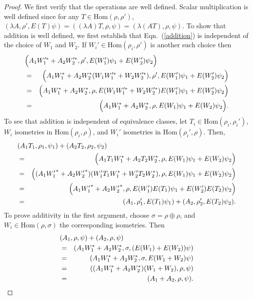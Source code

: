 \documentclass[11pt]{article}
\theoremstyle{definition}
\theoremstyle{definition}
\theoremstyle{remark}
\newcommand{\Hom}{\mathrm{Hom}}
\begin{document}
\begin{proof} We first verify that the operations are well defined.
  Scalar multiplication is well defined since for any $T\in \Hom (\rho
  ,\rho')$, $(\lambda A,\rho ',E(T)\psi )=((\lambda A)T,\rho ,\psi
  )=(\lambda (AT),\rho ,\psi )$.  To show that addition is well
  defined, we first establish that Eqn.\ (\ref{addition}) is
  independent of the choice of $W_1$ and $W_2$.  If $W_i'\in \Hom
  (\rho _i,\rho ')$ is another such choice then
  \begin{eqnarray*}
    \lefteqn{ \Bigl( A_1W_1'^*+A_2W_2'^*,\rho ',E(W_1')\psi _1+E(W_2')\psi _2 \Bigr) } \\
    &=& \Bigl( A_1W_1^*+A_2W_2^*(W_1W_1'^*+W_2W_2'^*),\rho ',E(W_1')\psi _1+E(W_2')\psi _2 \Bigr)  \\
    &=& \Bigl(A_1W_1^*+A_2W_2^*,\rho ,E(W_1W_1'^*+W_2W_2'^*)E(W_1')\psi _1+E(W_2')\psi _2 \Bigr) \\
    &=& \Bigl(A_1W_1^*+A_2W_2^*,\rho ,E(W_1)\psi _1+E(W_2)\psi _2 \Bigr) . \end{eqnarray*}  
  To see that addition is independent of equivalence classes, let $T_i\in \Hom (\rho
  _i,\rho _i')$, $W_i$ isometries in $\Hom (\rho _i,\rho )$, and $W_i'$ isometries in
  $\Hom (\rho _i',\rho )$.  Then, 
\begin{eqnarray*}
  \lefteqn{   (A_1T_1,\rho _1,\psi _1)+(A_2T_2,\rho _2,\psi _2) } \\
  &=& \Bigl( A_1T_1W_1^*+A_2T_2W_2^*,\rho ,E(W_1)\psi
  _1+E(W_2)\psi _2\Bigr) \\
  &=& \Bigl( (A_1{W'_1}^*+A_2{W'_2}^*)(W'_1T_1W_1^*+W'_2T_2W_2^*),\rho ,E(W_1)\psi _1+E(W_2)\psi _2\Bigr)
  \\
  &=& \Bigl( A_1{W'_1}^*+A_2{W'_2}^*,\rho ,E(W_1')E(T_1)\psi _1+E(W_2')E(T_2)\psi _2 \Bigr) \\
  &=& ( A_1,\rho _1', E(T_1)\psi _1)+(A_2,\rho _2',E(T_2)\psi _2 ) .\end{eqnarray*}
To prove additivity in the first argument, choose $\sigma =\rho \oplus \rho$, and
$W_i\in \Hom (\rho ,\sigma )$ the corresponding isometries.  Then  
\begin{eqnarray*}
  \lefteqn{ (A_1,\rho ,\psi )+(A_2,\rho ,\psi ) } \\
  & =& (A_1W_1^*+A_2W_2^*,\sigma ,(E(W_1)+E(W_2))\psi )  \\ 
  &=& (A_1W_1^*+A_2W_2^*,\sigma ,E(W_1+W_2)\psi ) \\
  &=& ((A_1W_1^*+A_2W_2^*)(W_1+W_2),\rho ,\psi ) \\
  &=& (A_1+A_2,\rho ,\psi ).\end{eqnarray*}  

\end{proof}
\end{document}
